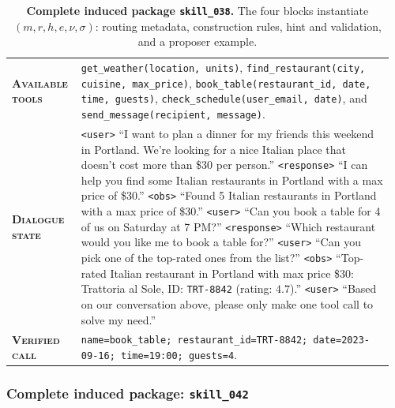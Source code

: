 \begin{table}[htbp]
\centering
\begin{minipage}{0.97\textwidth}
\raggedright
\small
\setlength{\tabcolsep}{3pt}
\renewcommand{\arraystretch}{1.16}
\vspace{0.35em}
\begin{tabular}{@{}>{\raggedright\arraybackslash\bfseries}p{0.17\linewidth} >{\raggedright\arraybackslash}p{0.79\linewidth}@{}}
    \textsc{Available tools} & \texttt{get\_weather(location, units)}, \texttt{find\_restaurant(city, cuisine, max\_price)}, \texttt{book\_table(restaurant\_id, date, time, guests)}, \texttt{check\_schedule(user\_email, date)}, and \texttt{send\_message(recipient, message)}. \\
    \textsc{Dialogue state} & \texttt{<user>} ``I want to plan a dinner for my friends this weekend in Portland. We're looking for a nice Italian place that doesn't cost more than \$30 per person.'' \texttt{<response>} ``I can help you find some Italian restaurants in Portland with a max price of \$30.'' \texttt{<obs>} ``Found 5 Italian restaurants in Portland with a max price of \$30.'' \texttt{<user>} ``Can you book a table for 4 of us on Saturday at 7 PM?'' \texttt{<response>} ``Which restaurant would you like me to book a table for?'' \texttt{<user>} ``Can you pick one of the top-rated ones from the list?'' \texttt{<obs>} ``Top-rated Italian restaurant in Portland with max price \$30: Trattoria al Sole, ID: \texttt{TRT-8842} (rating: $4.7$).'' \texttt{<user>} ``Based on our conversation above, please only make one tool call to solve my need.'' \\
    \textsc{Verified call} & \texttt{name=book\_table; restaurant\_id=TRT-8842; date=2023-09-16; time=19:00; guests=4}. \\
\end{tabular}
\vspace{0.45em}
\end{minipage}
\caption{\textbf{Complete induced package \texttt{skill\_038}.} The four blocks instantiate $(m,r,h,e,\nu,\sigma)$: routing metadata, construction rules, hint and validation, and a proposer example.}
\label{tab:complete_toolcall_skill}
\end{table}

\subsubsection{Complete induced package: \texttt{skill\_042}}
\label{app:complete_toolcall_skill_timeslot}

